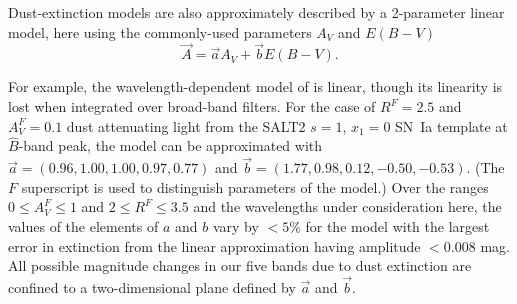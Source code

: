 \documentclass[trackchanges]{aastex62}   	%
\begin{document}
Dust-extinction
models are also approximately described by a 2-parameter linear model, here 
using the commonly-used parameters $A_V$ and $E(B-V)$
\begin{equation}
\vec{A} =\vec{ a}  A_{V} + \vec{b} E(B-V).
\label{f99:eqn}
\end{equation}

For example,   the wavelength-dependent model of  \citet{1989ApJ...345..245C} is linear,
though its linearity is lost when integrated over broad-band filters.
For the case of
$R^F=2.5$ and $A^F_V=0.1$ dust attenuating light from the SALT2
\citep{2007A&A...466...11G} $s=1$, $x_1=0$ SN~Ia template at ${\hat{B}}$-band peak, the 
 model
can be approximated with
$\vec{a} = (0.96,   1.00,   1.00,   0.97,   0.77)$ and $\vec{b}=(  1.77,   0.98,   0.12,  -0.50,  -0.53)$.
(The $F$ superscript is used to distinguish parameters of the  model.)
Over the ranges
 $0\le A^F_V\le 1$ and $2 \le R^F \le 3.5$ 
and the wavelengths under consideration here,  the values of the elements of $a$ and $b$ vary by $<5$\%
for the
 model with
 the largest error in extinction from the linear approximation having amplitude $<0.008$ mag.
All possible magnitude changes in our five bands due to    dust extinction are confined to a two-dimensional
plane defined by $\vec{a}$ and  $\vec{b}$. 
\end{document}
